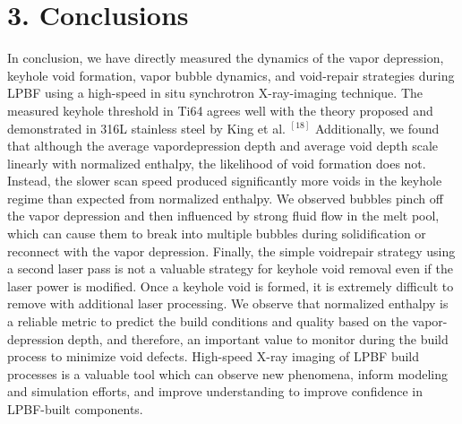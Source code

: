 \documentclass[10pt]{article}
\begin{document}
\section*{3. Conclusions}
In conclusion, we have directly measured the dynamics of the vapor depression, keyhole void formation, vapor bubble dynamics, and void-repair strategies during LPBF using a high-speed in situ synchrotron X-ray-imaging technique. The measured keyhole threshold in Ti64 agrees well with the theory proposed and demonstrated in 316L stainless steel by King et al. ${ }^{[18]}$ Additionally, we found that although the average vapordepression depth and average void depth scale linearly with normalized enthalpy, the likelihood of void formation does not. Instead, the slower scan speed produced significantly more voids in the keyhole regime than expected from normalized enthalpy. We observed bubbles pinch off the vapor depression and then influenced by strong fluid flow in the melt pool, which can cause them to break into multiple bubbles during solidification or reconnect with the vapor depression. Finally, the simple voidrepair strategy using a second laser pass is not a valuable strategy for keyhole void removal even if the laser power is modified. Once a keyhole void is formed, it is extremely difficult to remove with additional laser processing. We observe that normalized enthalpy is a reliable metric to predict the build conditions and quality based on the vapor-depression depth, and therefore, an important value to monitor during the build process to minimize void defects. High-speed X-ray imaging of LPBF build processes is a valuable tool which can observe new phenomena, inform modeling and simulation efforts, and improve understanding to improve confidence in LPBF-built components.
\end{document}
